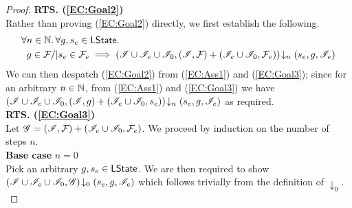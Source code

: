 \begin{lemma}
\begin{proof}
\noindent\textbf{RTS. (\ref{EC:Goal2})} \\
Rather than proving (\ref{EC:Goal2}) directly, we first establish the following.
%
\begin{align}
	& \forall n \in \mathbb{N}.\, \forall g, s_e \in \textsf{LState}.\, \nonumber\\
	& \;\; g \in \mathcal{F}_{} /| s_e \in \mathcal{F}_{e} \implies \left(\mathscr{I} \cup \mathscr{I}_e \cup \mathscr{I}_0, (\mathscr{I}, \mathcal{F}_{}) + (\mathscr{I}_{e} \cup \mathscr{I}_0, \mathcal{F}_{e})\right) \!\downarrow_{n} \left(s_e, g, \mathscr{I}_e\right) \label{EC:Goal3}
\end{align}
%
We can then despatch (\ref{EC:Goal2}) from (\ref{EC:Ass1}) and (\ref{EC:Goal3}); since for an arbitrary $n \in \mathbb{N}$, from (\ref{EC:Ass1}) and (\ref{EC:Goal3}) we have $\left(\mathscr{I} \cup \mathscr{I}_e \cup \mathscr{I}_0, (\mathscr{I}, g) + (\mathscr{I}_{e} \cup \mathscr{I}_0, s_e)\right) \!\downarrow_{n} \left(s_e, g, \mathscr{I}_e\right)$ as required. \\

\noindent\textbf{RTS. (\ref{EC:Goal3})} \\
Let $\mathscr{G} = (\mathscr{I}, \mathcal{F}_{}) + (\mathscr{I}_e \cup \mathscr{I}_0, \mathcal{F}_{e})$. We proceed by induction on the number of steps $n$.\\

\noindent\textbf{Base case }$n=0$\\
Pick an arbitrary $g, s_e \in \textsf{LState}$. We are then required to show	$\left(\mathscr{I} \cup \mathscr{I}_e \cup \mathscr{I}_0, \mathscr{G}\right) \!\downarrow_{0} \left(s_e, g, \mathscr{I}_e\right)$ which follows trivially from the definition of $\downarrow_0$.\\



\end{proof}
\end{lemma}
